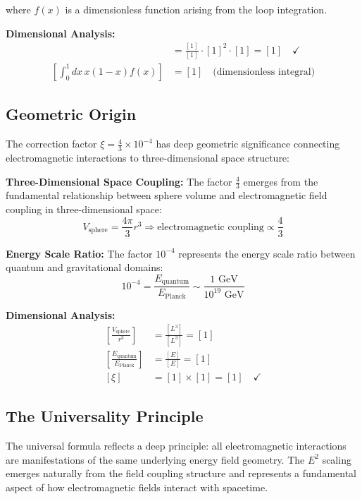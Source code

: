 \documentclass[12pt,a4paper]{report}
\begin{document}
where $f(x)$ is a dimensionless function arising from the loop integration.

\textbf{Dimensional Analysis:}
\begin{align}
	[\Delta a_\ell^{\text{loop}}] &= \frac{[1]}{[1]} \cdot [1]^2 \cdot [1] = [1] \quad \checkmark \\
	[\int_0^1 dx \, x(1-x) f(x)] &= [1] \quad \text{(dimensionless integral)}
\end{align}

\subsection{Geometric Origin}
\label{subsec:geometric_origin}

The correction factor $\xi = \frac{4}{3} \times 10^{-4}$ has deep geometric significance connecting electromagnetic interactions to three-dimensional space structure:

\textbf{Three-Dimensional Space Coupling:}
The factor $\frac{4}{3}$ emerges from the fundamental relationship between sphere volume and electromagnetic field coupling in three-dimensional space:
\begin{equation}
	V_{\text{sphere}} = \frac{4\pi}{3}r^3 \Rightarrow \text{electromagnetic coupling} \propto \frac{4}{3}
\end{equation}

\textbf{Energy Scale Ratio:}
The factor $10^{-4}$ represents the energy scale ratio between quantum and gravitational domains:
\begin{equation}
	10^{-4} = \frac{E_{\text{quantum}}}{E_{\text{Planck}}} \sim \frac{1 \text{ GeV}}{10^{19} \text{ GeV}}
\end{equation}

\textbf{Dimensional Analysis:}
\begin{align}
	\left[\frac{V_{\text{sphere}}}{r^3}\right] &= \frac{[L^3]}{[L^3]} = [1] \\
	\left[\frac{E_{\text{quantum}}}{E_{\text{Planck}}}\right] &= \frac{[E]}{[E]} = [1] \\
	[\xi] &= [1] \times [1] = [1] \quad \checkmark
\end{align}

\subsection{The Universality Principle}
\label{subsec:universality_principle}

The universal formula reflects a deep principle: all electromagnetic interactions are manifestations of the same underlying energy field geometry. The $E^2$ scaling emerges naturally from the field coupling structure and represents a fundamental aspect of how electromagnetic fields interact with spacetime.
\end{document}
